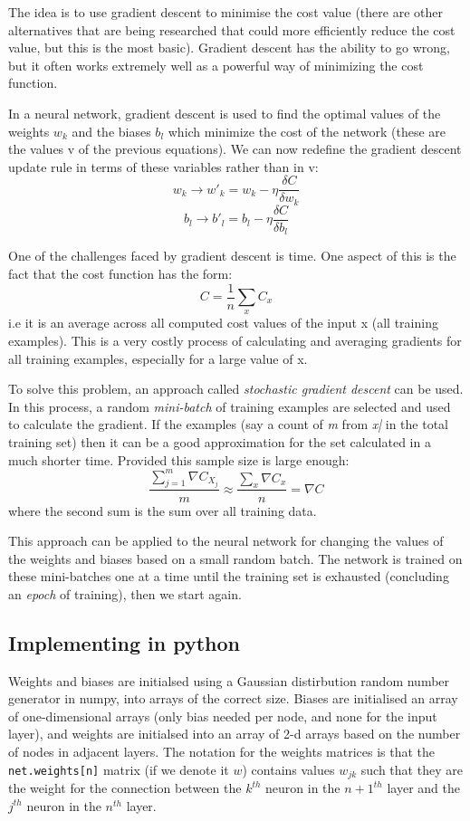 \documentclass[a4paper,12pt]{article}
\begin{document}
The idea is to use gradient descent to minimise the cost value (there are other alternatives that are being researched that could more efficiently reduce the cost value, but this is the most basic). Gradient descent has the ability to go wrong, but it often works extremely well as a powerful way of minimizing the cost function.

In a neural network, gradient descent is used to find the optimal values of the weights $w_k$ and the biases $b_l$ which minimize the cost of the network (these are the values v of the previous equations). We can now redefine the gradient descent update rule in terms of these variables rather than in v: $$w_k \rightarrow w'_k=w_k-\eta \frac{\delta C}{\delta w_k}$$ $$b_l \rightarrow b'_l=b_l-\eta \frac{\delta C}{\delta b_l}$$

One of the challenges faced by gradient descent is time. One aspect of this is the fact that the cost function has the form: $$C=\frac{1}{n}\sum_xC_x$$ i.e it is an average across all computed cost values of the input x (all training examples). This is a very costly process of calculating and averaging gradients for all training examples, especially for a large value of x.

To solve this problem, an approach called \textit{stochastic gradient descent} can be used. In this process, a random \textit{mini-batch} of training examples are selected and used to calculate the gradient. If the examples (say a count of \textit{m} from \textit{x|} in the total training set) then it can be a good approximation for the set calculated in a much shorter time. Provided this sample size is large enough:$$\frac{\sum_{j=1}^m \nabla C_{X_j}}{m} \approx \frac{\sum_x \nabla C_x}{n}=\nabla C$$ where the second sum is the sum over all training data.

This approach can be applied to the neural network for changing the values of the weights and biases based on a small random batch. The network is trained on these mini-batches one at a time until the training set is exhausted (concluding an \textit{epoch} of training), then we start again.

\subsection{Implementing in python}
Weights and biases are initialsed using a Gaussian distirbution random number generator in numpy, into arrays of the correct size. Biases are initialised an array of one-dimensional arrays (only bias needed per node, and none for the input layer), and weights are initialsed into an array of 2-d arrays based on the number of nodes in adjacent layers. The notation for the weights matrices is that the \texttt{net.weights[n]} matrix (if we denote it $w$) contains values $w_{jk}$ such that they are the weight for the connection between the $k^{th}$ neuron in the $n+1^{th}$ layer and the $j^{th}$ neuron in the $n^{th}$ layer.
\end{document}

